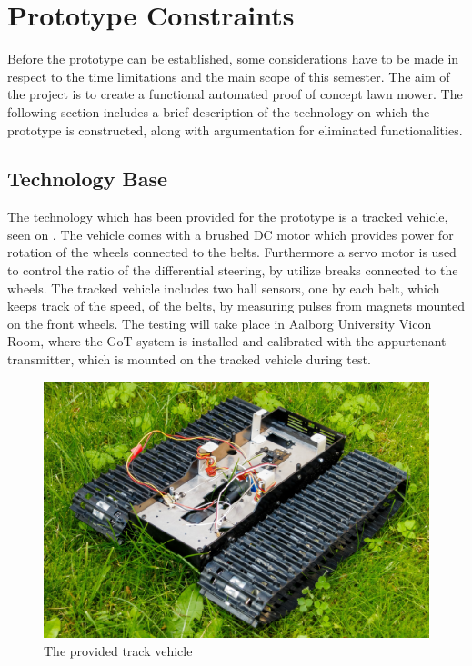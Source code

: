 \section{Prototype Constraints}
Before the prototype can be established, some considerations have to be made in respect to the time limitations and the main scope of this semester. The aim of the project is to create a functional automated proof of concept lawn mower. The following section includes a brief description of the technology on which the prototype is constructed, along with argumentation for eliminated functionalities.

\subsection{Technology Base}
The technology which has been provided for the prototype is a tracked vehicle, seen on . The vehicle comes with a brushed DC motor which provides power for rotation of the wheels connected to the belts. Furthermore a servo motor is used to control the ratio of the differential steering, by utilize breaks connected to the wheels. The tracked vehicle includes two hall sensors, one by each belt, which keeps track of the speed, of the belts, by measuring pulses from magnets mounted on the front wheels. The testing will take place in Aalborg University Vicon Room, where the GoT system is installed and calibrated with the appurtenant transmitter, which is mounted on the tracked vehicle during test.

\begin{figure}[H]
	\centering
	\includegraphics[scale=0.8]{figures/BeltVehicle.jpg}
	\caption{The provided track vehicle}
	\label{TrackedVehicle}
\end{figure}

